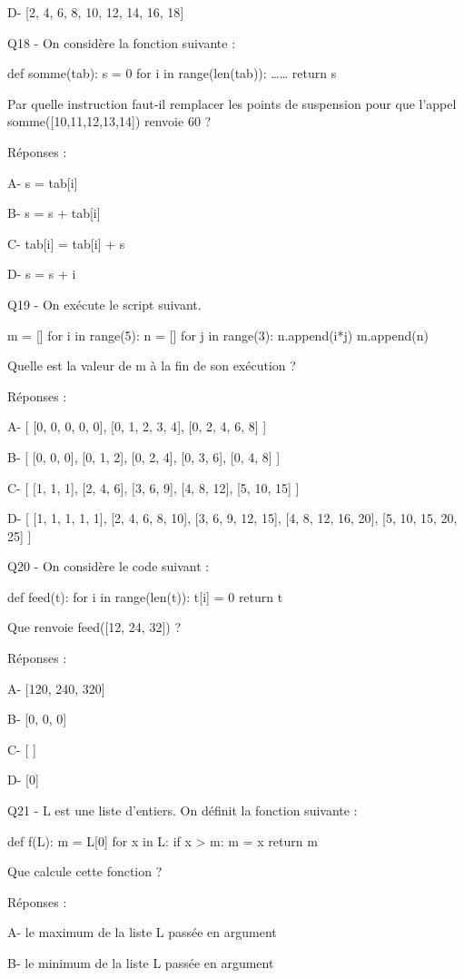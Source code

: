 \documentclass[
]{book}
\begin{document}
D- {[}2, 4, 6, 8, 10, 12, 14, 16, 18{]}

Q18 - On considère la fonction suivante :

def somme(tab):
s = 0
for i in range(len(tab)):
\ldots\ldots{}
return s

Par quelle instruction faut-il remplacer les points de suspension pour que l'appel somme({[}10,11,12,13,14{]}) renvoie 60 ?

Réponses :

A- s = tab{[}i{]}

B- s = s + tab{[}i{]}

C- tab{[}i{]} = tab{[}i{]} + s

D- s = s + i

Q19 - On exécute le script suivant.

m = {[}{]}
for i in range(5):
n = {[}{]}
for j in range(3):
n.append(i*j)
m.append(n)

Quelle est la valeur de m à la fin de son exécution ?

Réponses :

A- {[} {[}0, 0, 0, 0, 0{]}, {[}0, 1, 2, 3, 4{]}, {[}0, 2, 4, 6, 8{]} {]}

B- {[} {[}0, 0, 0{]}, {[}0, 1, 2{]}, {[}0, 2, 4{]}, {[}0, 3, 6{]}, {[}0, 4, 8{]} {]}

C- {[} {[}1, 1, 1{]}, {[}2, 4, 6{]}, {[}3, 6, 9{]}, {[}4, 8, 12{]}, {[}5, 10, 15{]} {]}

D- {[} {[}1, 1, 1, 1, 1{]}, {[}2, 4, 6, 8, 10{]}, {[}3, 6, 9, 12, 15{]}, {[}4, 8, 12, 16, 20{]}, {[}5, 10, 15, 20, 25{]} {]}

Q20 - On considère le code suivant :

def feed(t):
for i in range(len(t)):
t{[}i{]} = 0
return t

Que renvoie feed({[}12, 24, 32{]}) ?

Réponses :

A- {[}120, 240, 320{]}

B- {[}0, 0, 0{]}

C- {[} {]}

D- {[}0{]}

Q21 - L est une liste d'entiers. On définit la fonction suivante :

def f(L):
m = L{[}0{]}
for x in L:
if x \textgreater{} m:
m = x
return m

Que calcule cette fonction ?

Réponses :

A- le maximum de la liste L passée en argument

B- le minimum de la liste L passée en argument
\end{document}
